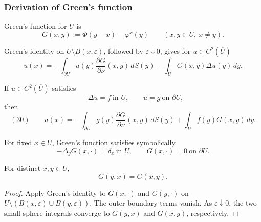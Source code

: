 \subsubsection{Derivation of Green's function}
\label{sec:laplace-greens-function-derivation}

\begin{definition}
\label{def:greens-function}

Green's function for $U$ is
$$G(x,y):=\Phi(y-x)-\varphi^x(y)
\qquad(x,y\in U,\ x\ne y).$$
\end{definition}

Green's identity on $U\setminus B(x,\varepsilon)$, followed by
$\varepsilon\downarrow0$, gives for $u\in C^2(\overline U)$
$$u(x)=-\int_{\partial U}u(y)\frac{\partial G}{\partial\nu}(x,y)\,dS(y)
-\int_U G(x,y)\Delta u(y)\,dy.$$

\begin{theorem}
\label{thm:representation-formula-greens-function}

If $u\in C^2(\overline U)$ satisfies
$$-\Delta u=f\ \text{in }U,
\qquad
u=g\ \text{on }\partial U,$$
then
$$(30)\qquad
u(x)=-\int_{\partial U}g(y)\frac{\partial G}{\partial\nu}(x,y)\,dS(y)
+\int_U f(y)G(x,y)\,dy.$$
\end{theorem}

\begin{remark}
\label{rem:greens-function-dirac-delta}

For fixed $x\in U$, Green's function satisfies symbolically
$$-\Delta_yG(x,\cdot)=\delta_x\ \text{in }U,
\qquad
G(x,\cdot)=0\ \text{on }\partial U.$$
\end{remark}

\begin{theorem}
\label{thm:greens-function-symmetry}

For distinct $x,y\in U$,
$$G(y,x)=G(x,y).$$
\end{theorem}
\begin{proof}
\sketch Apply Green's identity to $G(x,\cdot)$ and $G(y,\cdot)$ on
$U\setminus(B(x,\varepsilon)\cup B(y,\varepsilon))$. The outer boundary terms
vanish. As $\varepsilon\downarrow0$, the two small-sphere integrals converge
to $G(y,x)$ and $G(x,y)$, respectively.
\end{proof}

